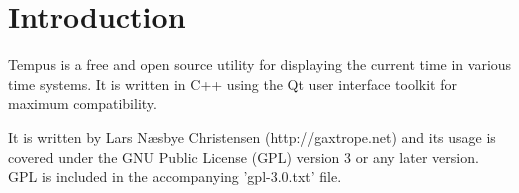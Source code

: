 \section{Introduction}
Tempus is a free and open source utility for displaying the current time in various time systems. It is written in C++ using the Qt user interface toolkit for maximum compatibility.

It is written by Lars Næsbye Christensen (http://gaxtrope.net) and its usage is covered under the GNU Public License (GPL) version 3 or any later version. GPL is included in the accompanying 'gpl-3.0.txt' file.


